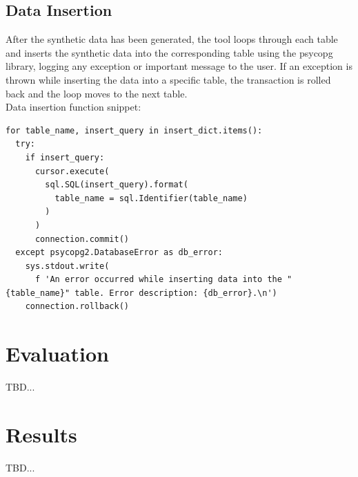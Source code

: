\subsection{Data Insertion}
After the synthetic data has been generated, the tool loops through each table and inserts the synthetic data into the corresponding table using the psycopg library, logging any exception or important message to the user. If an exception is thrown while inserting the data into a specific table, the transaction is rolled back and the loop moves to the next table.\\
\newline
Data insertion function snippet:
\begin{verbatim}
for table_name, insert_query in insert_dict.items():
  try:
    if insert_query:
      cursor.execute(
        sql.SQL(insert_query).format(
          table_name = sql.Identifier(table_name)
        )
      ) 
      connection.commit()
  except psycopg2.DatabaseError as db_error:
    sys.stdout.write(
      f 'An error occurred while inserting data into the "{table_name}" table. Error description: {db_error}.\n')
    connection.rollback()
\end{verbatim}
\section{Evaluation}
TBD...
\section{Results}
TBD...